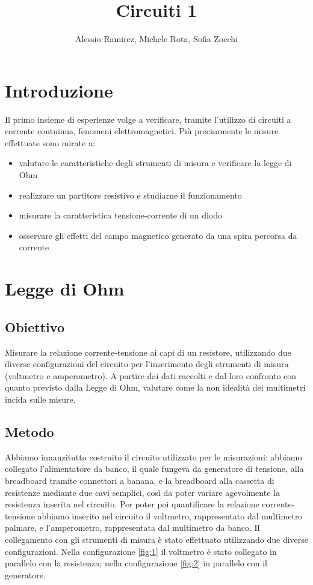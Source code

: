 \documentclass[a4paper]{article}
\title{Circuiti 1}
\author{Alessio Ramirez, Michele Rota, Sofia Zocchi}
\begin{document}
\maketitle

\tableofcontents
\newpage

\section{Introduzione}
Il primo insieme di esperienze volge a verificare, tramite l'utilizzo di circuiti a
corrente contuinua, fenomeni elettromagnetici. Più precisamente le misure effettuate sono mirate a:
\begin{itemize}
	\item valutare le caratteristiche degli strumenti di misura e verificare la legge di Ohm
	\item realizzare un partitore resistivo e studiarne il funzionamento
	\item misurare la caratteristica tensione-corrente di un diodo
	\item osservare gli effetti del campo magnetico generato da una spira percorsa da corrente
\end{itemize}

\section{Legge di Ohm}
\subsection{Obiettivo}
Misurare la relazione corrente-tensione ai capi di un resistore, utilizzando due diverse configurazioni del circuito per l'inserimento degli strumenti di misura
(voltmetro e amperometro). A partire dai dati raccolti e dal loro confronto con quanto previsto dalla Legge di Ohm, valutare come la non idealità dei multimetri incida sulle misure.
\subsection{Metodo}
Abbiamo innanzitutto costruito il circuito utilizzato per le misurazioni: abbiamo collegato l'alimentatore da banco, il quale fungeva da generatore di tensione, alla breadboard tramite connettori a banana,
e la breadboard alla cassetta di resistenze mediante due cavi semplici, così da poter variare agevolmente la resistenza inserita nel circuito.
Per poter poi quantificare la relazione corrente-tensione abbiamo inserito nel circuito il voltmetro, rappresentato dal multimetro palmare, e l'amperometro, rappresentata dal multimetro da banco.
Il collegamento con gli strumenti di misura è stato effettuato utilizzando due diverse configurazioni. Nella configurazione \ref{fig:1} il voltmetro è stato collegato in parallelo con la resistenza;
nella configurazione \ref{fig:2} in parallelo con il generatore.
\end{document}

